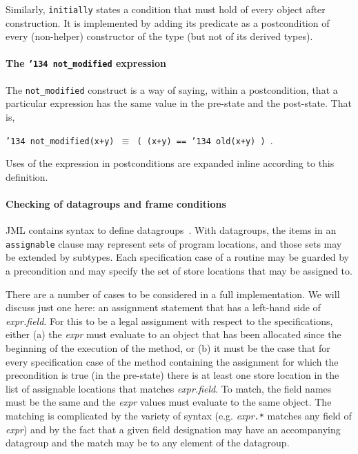 \documentclass{llncs}
\begin{document}
Similarly, \texttt{initially} states a condition that must hold of
every object after construction.  It is implemented by adding its
predicate as a postcondition of every (non-helper) constructor of the
type (but not of its derived types).

\paragraph*{The \texttt{\char'134 not\_modified} expression}
The \texttt{not\_modified} construct is a way of saying, within a
postcondition, that a particular expression has the same value in the
pre-state and the post-state.  That is,
\begin{center}
\texttt{\char'134 not\_modified(x+y) $\equiv$ ( (x+y) == \char'134 old(x+y) )  }.
\end{center}
Uses of the expression in postconditions are expanded inline according
to this definition.

\paragraph*{Checking of datagroups and frame conditions}
JML contains syntax to define 
datagroups~\cite{Leino-Poetzsch-Heffter-Zhou02}.  With datagroups, the items in
an \texttt{assignable} clause may represent sets of program locations,
and those sets may be extended by subtypes.  Each
specification case of a routine may be guarded by a
precondition and may specify the set of store locations that may be
assigned to.

There are a number of cases to be considered in a full implementation.
We will discuss just one here: an assignment statement that has a
left-hand side of \textit{expr.field}.  For this to be a legal
assignment with respect to the specifications, either (a) the
\textit{expr} must evaluate to an object that has been allocated since
the beginning of the execution of the method, or (b) it must be the
case that for every specification case of the method containing the assignment
for which the precondition is true (in the pre-state) there is at
least one store location in the list of assignable locations that
matches \textit{expr.field}.  To match, the field names must be the
same and the \textit{expr} values must evaluate to the same object.
The matching is complicated by the variety of syntax (e.g.
\textit{expr}\texttt{.*} matches any field of \textit{expr}) and by
the fact that a given field designation may have an accompanying
datagroup and the match may be to any element of the datagroup.
\end{document}
